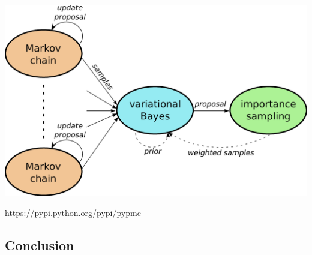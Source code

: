 \documentclass[english]{beamer}
\newcommand{\slide}[2][t]{\begin{frame}[#1] \frametitle{\insertsubsectionhead} #2 \end{frame}}
\begin{document}
\slide{

    \includegraphics[width=\textwidth]{figures/algorithm}

    \begin{center}
        \url{https://pypi.python.org/pypi/pypmc}
    \end{center}

}

\subsection{Conclusion} %
\end{document}
